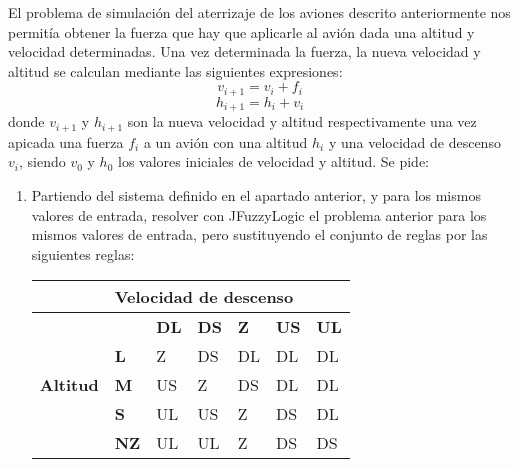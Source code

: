 \documentclass[
]{article}
\begin{document}
El problema de simulación del aterrizaje de los aviones descrito
anteriormente nos permitía obtener la fuerza que hay que aplicarle al
avión dada una altitud y velocidad determinadas. Una vez determinada la
fuerza, la nueva velocidad y altitud se calculan mediante las siguientes
expresiones: \[v_{i+1}=v_{i}+f_{i}\] \[h_{i+1}=h_{i}+v_{i}\] donde
\(v_{i+1}\) y \(h_{i+1}\) son la nueva velocidad y altitud
respectivamente una vez apicada una fuerza \(f_{i}\) a un avión con una
altitud \(h_{i}\) y una velocidad de descenso \(v_{i}\), siendo
\(v_{0}\) y \(h_{0}\) los valores iniciales de velocidad y altitud. Se
pide:

\begin{enumerate}
\def\labelenumi{\arabic{enumi}.}
\item
  Partiendo del sistema definido en el apartado anterior, y para los
  mismos valores de entrada, resolver con JFuzzyLogic el problema
  anterior para los mismos valores de entrada, pero sustituyendo el
  conjunto de reglas por las siguientes reglas:

  \begin{table}[H]
  \centering
  \begin{tabular}{|l|llllll|}
  \hline
                                 & \multicolumn{6}{l|}{\textbf{Velocidad de descenso}}                                                                                                                                       \\ \hline
  \multirow{5}{*}{\textbf{Altitud}} & \multicolumn{1}{l|}{}            & \multicolumn{1}{l|}{\textbf{DL}} & \multicolumn{1}{l|}{\textbf{DS}} & \multicolumn{1}{l|}{\textbf{Z}} & \multicolumn{1}{l|}{\textbf{US}} & \textbf{UL} \\ \cline{2-7} 
                                 & \multicolumn{1}{l|}{\textbf{L}}  & \multicolumn{1}{l|}{Z}           & \multicolumn{1}{l|}{DS}          & \multicolumn{1}{l|}{DL}         & \multicolumn{1}{l|}{DL}          & DL          \\ \cline{2-7} 
                                 & \multicolumn{1}{l|}{\textbf{M}}  & \multicolumn{1}{l|}{US}          & \multicolumn{1}{l|}{Z}           & \multicolumn{1}{l|}{DS}         & \multicolumn{1}{l|}{DL}          & DL          \\ \cline{2-7} 
                                 & \multicolumn{1}{l|}{\textbf{S}}  & \multicolumn{1}{l|}{UL}          & \multicolumn{1}{l|}{US}          & \multicolumn{1}{l|}{Z}          & \multicolumn{1}{l|}{DS}          & DL          \\ \cline{2-7} 
                                 & \multicolumn{1}{l|}{\textbf{NZ}} & \multicolumn{1}{l|}{UL}          & \multicolumn{1}{l|}{UL}          & \multicolumn{1}{l|}{Z}          & \multicolumn{1}{l|}{DS}          & DS          \\ \hline
  \end{tabular}
  \end{table}


\end{enumerate}
\end{document}
